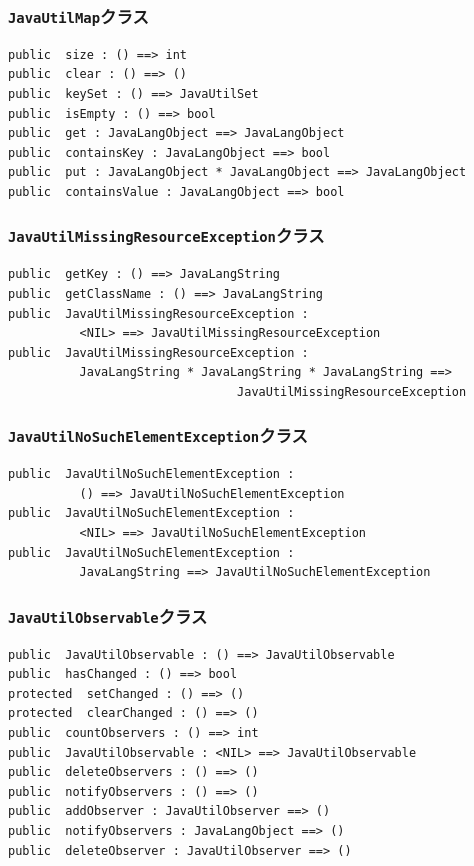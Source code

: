 \documentclass[\pformat,12pt]{jarticle}
\begin{document}
\subsubsection{\texttt{JavaUtilMap}クラス}
\begin{small}
\begin{verbatim}
public  size : () ==> int
public  clear : () ==> ()
public  keySet : () ==> JavaUtilSet
public  isEmpty : () ==> bool
public  get : JavaLangObject ==> JavaLangObject
public  containsKey : JavaLangObject ==> bool
public  put : JavaLangObject * JavaLangObject ==> JavaLangObject
public  containsValue : JavaLangObject ==> bool
\end{verbatim}
\end{small}

\subsubsection{\texttt{JavaUtilMissingResourceException}クラス}
\begin{small}
\begin{verbatim}
public  getKey : () ==> JavaLangString
public  getClassName : () ==> JavaLangString
public  JavaUtilMissingResourceException : 
          <NIL> ==> JavaUtilMissingResourceException
public  JavaUtilMissingResourceException : 
          JavaLangString * JavaLangString * JavaLangString ==> 
                                JavaUtilMissingResourceException
\end{verbatim}
\end{small}

\subsubsection{\texttt{JavaUtilNoSuchElementException}クラス}
\begin{small}
\begin{verbatim}
public  JavaUtilNoSuchElementException : 
          () ==> JavaUtilNoSuchElementException
public  JavaUtilNoSuchElementException : 
          <NIL> ==> JavaUtilNoSuchElementException
public  JavaUtilNoSuchElementException : 
          JavaLangString ==> JavaUtilNoSuchElementException
\end{verbatim}
\end{small}

\subsubsection{\texttt{JavaUtilObservable}クラス}
\begin{small}
\begin{verbatim}
public  JavaUtilObservable : () ==> JavaUtilObservable
public  hasChanged : () ==> bool
protected  setChanged : () ==> ()
protected  clearChanged : () ==> ()
public  countObservers : () ==> int
public  JavaUtilObservable : <NIL> ==> JavaUtilObservable
public  deleteObservers : () ==> ()
public  notifyObservers : () ==> ()
public  addObserver : JavaUtilObserver ==> ()
public  notifyObservers : JavaLangObject ==> ()
public  deleteObserver : JavaUtilObserver ==> ()
\end{verbatim}
\end{small}
\end{document}
